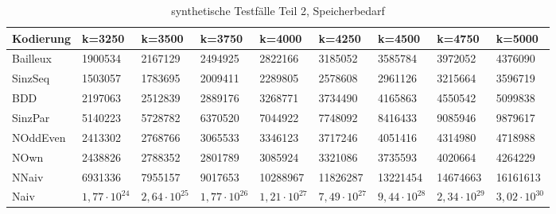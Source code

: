 \documentclass[a4,abstract=on]{scrartcl}
\begin{document}
\begin{landscape}
\begin{table}[h!]
   \end{table}
	


\begin{table}[h!]
    \small
    \setlength{\tabcolsep}{0.11cm}
     \centering
     \begin{tabular}[width=\textwidth]{|l||l|l|l|l|l|l|l|l|}
	\hline
       \textbf{Kodierung} &\textbf{k=3250} &\textbf{k=3500} &\textbf{k=3750} &\textbf{k=4000} &\textbf{k=4250} &\textbf{k=4500} &\textbf{k=4750} &\textbf{k=5000}\\
	\hline
	\hline
 Bailleux & 1900534 & 2167129 & 2494925 & 2822166 & 3185052 & 3585784 & 3972052 & 4376090\\
\hline
SinzSeq  & 1503057 & 1783695 & 2009411 & 2289805 & 2578608 & 2961126 & 3215664 & 3596719\\
\hline
BDD & 2197063 & 2512839 & 2889176 & 3268771 & 3734490 & 4165863 & 4550542 & 5099838\\
\hline
SinzPar & 5140223 & 5728782& 6370520 & 7044922 & 7748092 & 8416433 & 9085946 & 9879617\\
\hline
NOddEven & 2413302 & 2768766  & 3065533 & 3346123 & 3717246 & 4051416 & 4314980 & 4718988\\
\hline
NOwn  & 2438826 & 2788352 & 2801789 & 3085924 & 3321086 & 3735593 & 4020664 & 4264229\\
\hline
NNaiv  & 6931336 & 7955157 & 9017653 & 10288967 & 11826287 & 13221454 & 14674663 & 16161613\\
\hline
Naiv  & $1,77 \cdot 10^{24}$ & $2,64 \cdot 10^{25}$ & $1,77 \cdot 10^{26}$ & $1,21 \cdot 10^{27}$ & $7,49 \cdot 10^{27}$ & $9,44 \cdot 10^{28}$ & $2,34 \cdot 10^{29}$ & $3,02 \cdot 10^{30}$\\
\hline

 \end{tabular}

     \caption{synthetische Testfälle Teil 2, Speicherbedarf}
     \label{tbl:beispieltabelle}

   \end{table}
	

\end{landscape}	
\end{document}

